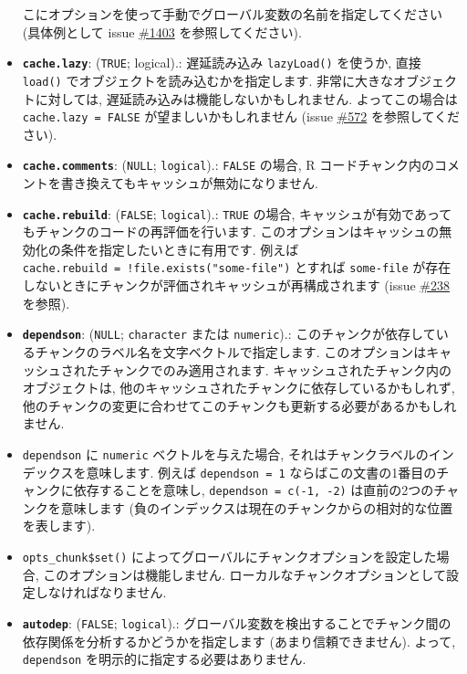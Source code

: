 \documentclass[
]{bxjsreport}
\begin{document}
\begin{itemize}
  こにオプションを使って手動でグローバル変数の名前を指定してください
  (具体例として issue
  \href{https://github.com/yihui/knitr/issues/1403}{\#1403}
  を参照してください).
\item
  \textbf{\texttt{cache.lazy}}: (\texttt{TRUE}; logical).: 遅延読み込み
  \texttt{lazyLoad()} を使うか, 直接 \texttt{load()}
  でオブジェクトを読み込むかを指定します.
  非常に大きなオブジェクトに対しては,
  遅延読み込みは機能しないかもしれません. よってこの場合は
  \texttt{cache.lazy\ =\ FALSE} が望ましいかもしれません (issue
  \href{https://github.com/yihui/knitr/issues/572}{\#572}
  を参照してください).
\item
  \textbf{\texttt{cache.comments}}: (\texttt{NULL}; \texttt{logical}).:
  \texttt{FALSE} の場合, R
  コードチャンク内のコメントを書き換えてもキャッシュが無効になりません.
\item
  \textbf{\texttt{cache.rebuild}}: (\texttt{FALSE}; \texttt{logical}).:
  \texttt{TRUE} の場合,
  キャッシュが有効であってもチャンクのコードの再評価を行います.
  このオプションはキャッシュの無効化の条件を指定したいときに有用です.
  例えば \texttt{cache.rebuild\ =\ !file.exists("some-file")} とすれば
  \texttt{some-file}
  が存在しないときにチャンクが評価されキャッシュが再構成されます (issue
  \href{https://github.com/yihui/knitr/issues/238}{\#238} を参照).
\item
  \textbf{\texttt{dependson}}: (\texttt{NULL}; \texttt{character} または
  \texttt{numeric}).:
  このチャンクが依存しているチャンクのラベル名を文字ベクトルで指定します.
  このオプションはキャッシュされたチャンクでのみ適用されます.
  キャッシュされたチャンク内のオブジェクトは,
  他のキャッシュされたチャンクに依存しているかもしれず,
  他のチャンクの変更に合わせてこのチャンクも更新する必要があるかもしれません.
\item
  \texttt{dependson} に \texttt{numeric} ベクトルを与えた場合,
  それはチャンクラベルのインデックスを意味します. 例えば
  \texttt{dependson\ =\ 1}
  ならばこの文書の1番目のチャンクに依存することを意味し,
  \texttt{dependson\ =\ c(-1,\ -2)} は直前の2つのチャンクを意味します
  (負のインデックスは現在のチャンクからの相対的な位置を表します).
\item
  \texttt{opts\_chunk\$set()}
  によってグローバルにチャンクオプションを設定した場合,
  このオプションは機能しません.
  ローカルなチャンクオプションとして設定しなければなりません.
\item
  \textbf{\texttt{autodep}}: (\texttt{FALSE}; \texttt{logical}).:
  グローバル変数を検出することでチャンク間の依存関係を分析するかどうかを指定します
  (あまり信頼できません). よって, \texttt{dependson}
  を明示的に指定する必要はありません.
\end{itemize}
\end{document}
